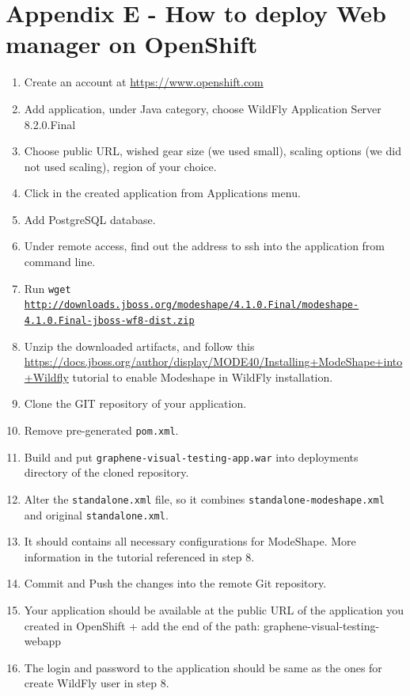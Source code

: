 \documentclass[11pt,oneside,final]{fithesis2}
\begin{document}
\chapter{Appendix E - How to deploy Web manager on OpenShift}
\label{appendix:e}
\begin{enumerate}
 \item Create an account at \url{https://www.openshift.com}
 \item Add application, under Java category, choose WildFly Application Server 8.2.0.Final
 \item Choose public URL, wished gear size (we used small), scaling options (we did not used scaling), region of your choice.
 \item Click in the created application from Applications menu.
 \item Add PostgreSQL database.
 \item Under remote access, find out the address to ssh into the application from command line.
 \item Run \texttt{wget \url{http://downloads.jboss.org/modeshape/4.1.0.Final/modeshape-4.1.0.Final-jboss-wf8-dist.zip}}
 \item Unzip the downloaded artifacts, and follow this 
    \url{https://docs.jboss.org/author/display/MODE40/Installing+ModeShape+into+Wildfly} tutorial to 
    enable Modeshape in WildFly installation.
 \item Clone the GIT repository of your application.
 \item Remove pre-generated \texttt{pom.xml}.
 \item Build and put \texttt{graphene-visual-testing-app.war} into deployments directory of the cloned repository.
 \item Alter the \texttt{standalone.xml} file, so it combines \texttt{standalone-modeshape.xml} and original \texttt{standalone.xml}.
 \item It should contains all necessary configurations for ModeShape. More information in the tutorial referenced in step 8.
 \item Commit and Push the changes into the remote Git repository.
 \item Your application should be available at the public URL of the application you created in OpenShift + add the end of the path:
 graphene-visual-testing-webapp
 \item The login and password to the application should be same as the ones for create WildFly user in step 8.
\end{enumerate}
\end{document}
